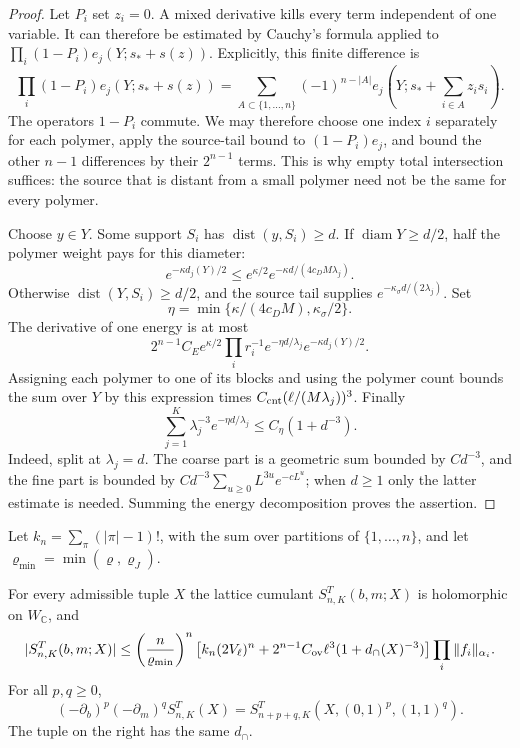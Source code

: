 \documentclass[11pt,letterpaper,reqno]{amsart}
\makeatletter
\theoremstyle{definition}
\newcommand{\ms@minorstart}{%
  \pushQED{\qed}\renewcommand{\qedsymbol}{$\blacksquare$}}
\newenvironment{proposition}[1][]{\ms@minorstart\ms@proposition[#1]}
  {\popQED\endms@proposition}
\theoremstyle{remark}
\makeatother
\begin{document}
\begin{proof}
Let $P_i$ set $z_i=0$. A mixed derivative kills every term
independent of one variable. It can therefore be estimated by
Cauchy's formula applied to $\prod_i(1-P_i)e_j(Y;s_*+s(z))$.
Explicitly, this finite difference is
\[
 \prod_i(1-P_i)e_j(Y;s_*+s(z))
 =\sum_{A\subset\{1,\ldots,n\}}(-1)^{n-|A|}
        e_j\left(Y;s_*+\sum_{i\in A}z_is_i\right).
\]
The operators $1-P_i$ commute. We may therefore choose one
index $i$ separately for each polymer, apply the source-tail
bound to $(1-P_i)e_j$, and bound the other $n-1$
differences by their $2^{n-1}$ terms. This is why empty
total intersection suffices: the source that is distant
from a small polymer need not be the same for every polymer.

Choose $y\in Y$. Some support $S_i$ has
$\operatorname{dist}(y,S_i)\ge d$. If
$\operatorname{diam}Y\ge d/2$, half the polymer weight pays
for this diameter:
\[
 e^{-\kappa d_j(Y)/2}
 \le e^{\kappa/2}e^{-\kappa d/(4c_DM\lambda_j)}.
\]
Otherwise $\operatorname{dist}(Y,S_i)\ge d/2$, and the source
tail supplies $e^{-\kappa_\sigma d/(2\lambda_j)}$.
Set
\[
 \eta=\min\{\kappa/(4c_DM),\kappa_\sigma/2\}.
\]
The derivative of one energy is at most
\[
 2^{n-1}C_Ee^{\kappa/2}\prod_i r_i^{-1}
 e^{-\eta d/\lambda_j}e^{-\kappa d_j(Y)/2}.
\]
Assigning each polymer to one of its blocks and using the
polymer count bounds the sum over $Y$ by this expression
times $C_{\rm cnt}(\ell/(M\lambda_j))^3$.
Finally
\[
 \sum_{j=1}^K\lambda_j^{-3}e^{-\eta d/\lambda_j}
 \le C_\eta(1+d^{-3}).
\]
Indeed, split at $\lambda_j=d$. The coarse part is a geometric
sum bounded by $Cd^{-3}$, and the fine part is bounded by
$Cd^{-3}\sum_{u\ge0}L^{3u}e^{-cL^u}$; when $d\ge1$ only
the latter estimate is needed. Summing the energy decomposition
proves the assertion.
\end{proof}

Let $k_n=\sum_{\pi}(|\pi|-1)!$, with the sum over partitions
of $\{1,\ldots,n\}$, and let
$\varrho_{\min}=\min(\varrho,\varrho_J)$.

\begin{proposition}[Uniform cumulants at complex parameters]\label{C-412-54}
For every admissible tuple $X$ the lattice cumulant
$S^T_{n,K}(b,m;X)$ is holomorphic on $W_{\mathbb C}$, and
\begin{equation}\label{eq:qcdm2-overlap-cumulant}
 |S^T_{n,K}(b,m;X)|
 \le\left(\frac n{\varrho_{\min}}\right)^n
 \left[k_n(2V_\ell)^n+
       2^{n-1}C_{\rm ov}\ell^3(1+d_\cap(X)^{-3})\right]
 \prod_i\|f_i\|_{\alpha_i}.
\end{equation}
For all $p,q\ge0$,
\begin{equation}\label{eq:qcdm2-parameter-insertion}
 (-\partial_b)^p(-\partial_m)^q S^T_{n,K}(X)
 =S^T_{n+p+q,K}(X,(0,1)^p,(1,1)^q).
\end{equation}
The tuple on the right has the same $d_\cap$.
\end{proposition}
\end{document}
